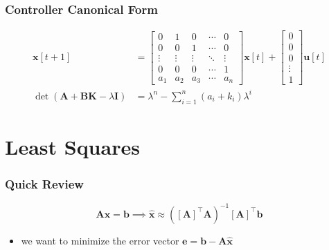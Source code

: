 \documentclass[aspectratio=169]{beamer}
\newcommand{\tpose}[1]{\left[#1\right]^{\! \top} \!\!}
\begin{document}
\begin{frame}
    \frametitle{Controller Canonical Form}

    \begin{align}
        \bm{x}[t + 1] &=
        \begin{bmatrix}
            0 & 1 & 0 & \cdots & 0 \\
            0 & 0 & 1 & \cdots & 0 \\
            \vdots & \vdots & \vdots & \ddots & \vdots \\
            0 & 0 & 0 & \cdots & 1 \\
            a_1 & a_2 & a_3 & \cdots & a_n
        \end{bmatrix} \bm{x}[t] +
        \begin{bmatrix}
            0 \\
            0 \\
            0 \\
            \vdots \\
            1
        \end{bmatrix} \bm{u}[t] \\
        \det(\bm{A} + \bm{BK} - \lambda \bm{I}) &= \lambda^n - \sum_{i = 1}^n (a_i + k_i) \lambda^i
    \end{align}
\end{frame}

\section{Least Squares}

\begin{frame}
    \frametitle{Quick Review}

    \begin{equation}
        \bm{Ax} = \bm{b} \implies \bm{\hat{x}} \approx (\tpose{\bm{A}} \bm{A})^{-1} \tpose{\bm{A}} \bm{b}
    \end{equation}
    \begin{itemize}
        \item we want to minimize the error vector \(\bm{e} = \bm{b} - \bm{A} \bm{\hat{x}}\)
    \end{itemize}
\end{frame}
\end{document}
